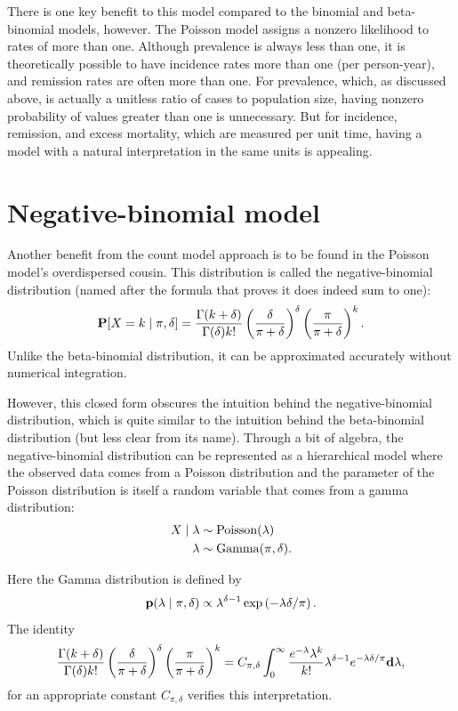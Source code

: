 There is one key benefit to this model compared to the binomial and
beta-binomial models, however.  The Poisson model assigns a nonzero
likelihood to rates of more than one.  Although prevalence is always
less than one, it is theoretically possible to have incidence rates
more than one (per person-year), and remission rates are often more
than one.  For prevalence, which, as discussed above, is actually a
unitless ratio of cases to population size, having nonzero probability
of values greater than one is unnecessary.  But for incidence,
remission, and excess mortality, which are measured per unit time,
having a model with a natural interpretation in the same units is
appealing.


\section{Negative-binomial model}
Another benefit from the count model approach is to be found in the
Poisson model's overdispersed cousin.  This distribution is called
the negative-binomial distribution (named after the formula that
proves it does indeed sum to one):
\[
\mathbf{P}[X = k\;|\; \pi, \delta] =
 \frac{\Gamma(k+\delta)}{\Gamma(\delta)k!} \left(\frac{\delta}{\pi+\delta}\right)^\delta \left(\frac{\pi}{\pi+\delta}\right)^k.
\]
Unlike the beta-binomial distribution, it can be approximated
accurately without numerical integration.

However, this closed form obscures the intuition behind the
negative-binomial distribution, which is quite similar to the
intuition behind the beta-binomial distribution (but less clear from
its name). Through a bit of algebra, the negative-binomial
distribution can be represented as a hierarchical model where the
observed data comes from a Poisson distribution and the parameter of
the Poisson distribution is itself a random variable that comes from a
gamma distribution:
\begin{align*}
X\;|\; \lambda &\sim \operatorname{Poisson}(\lambda)\\
\lambda &\sim \operatorname{Gamma}(\pi, \delta).
\end{align*}

Here the Gamma distribution is defined by
\[
\mathbf{p}(\lambda \;|\; \pi, \delta) \propto \lambda^{\delta-1} \exp\left(-\lambda \delta/\pi \right).
\]
The identity
\[
\frac{\Gamma(k+\delta)}{\Gamma(\delta)k!} \left(\frac{\delta}{\pi+\delta}\right)^\delta \left(\frac{\pi}{\pi+\delta}\right)^k
=
 C_{\pi, \delta} \int_0^\infty \frac{e^{-\lambda}\lambda^k}{k!} \lambda^{\delta-1} e^{-\lambda \delta/\pi} \mathbf{d} \lambda,
\]
for an appropriate constant $C_{\pi,\delta}$ verifies this interpretation.

